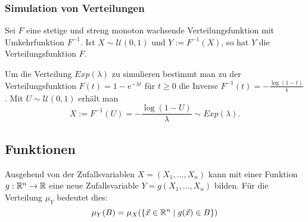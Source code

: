 
\subsubsection{Simulation von Verteilungen}

\begin{theorem}
	Sei \(F\) eine stetige und streng monoton wachsende Verteilungsfunktion mit Umkehrfunktion \(F^{-1}\). Ist \(X \sim \mathcal{U}(0,1)\) und \(Y := F^{-1}(X)\), so hat \(Y\) die Verteilungsfunktion \(F\).
\end{theorem}

\begin{example} Um die Verteilung \(Exp(\lambda)\) zu simulieren bestimmt man zu der Verteilungsfunktion \(F(t) = 1-e^{-\lambda t}\) für \(t \geq 0\) die Inverse \(F^{-1}(t) = -\frac{\log(1-t)}{\lambda}\). Mit \(U \sim \mathcal{U}(0,1)\) erhält man
	\[
		X := F^{-1}(U) = -\frac{\log(1-U)}{\lambda} \sim Exp(\lambda).
	\]
\end{example}



\subsection{Funktionen}

Ausgehend von der Zufallsvariablen \(X = (X_1,\ldots,X_n)\) kann mit einer Funktion \(g:\mathbb{R}^n\rightarrow\mathbb{R}\)
eine neue Zufallsvariable \(Y = g(X_1,\ldots,X_n)\) bilden. Für die Verteilung \(\mu_Y\) bedeutet dies:
\[	\mu_Y(B) = \mu_X(\{ \vec{x} \in \mathbb{R}^n \mid g(\vec{x} ) \in B \}) \]

